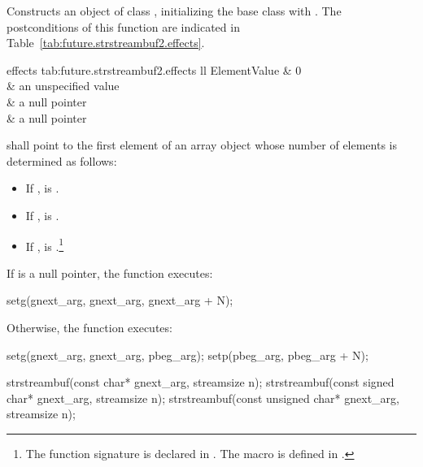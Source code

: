 \begin{itemdescr}
\pnum
\effects
Constructs an object of class
,
initializing the base class with
.
The postconditions of this function are indicated in Table~\ref{tab:future.strstreambuf2.effects}.

\begin{libtab2}{ effects}
{tab:future.strstreambuf2.effects}
{ll}
{Element}{Value}
	&	0						\\
	&	an unspecified value	\\
	&	a null pointer			\\
	&	a null pointer			\\
\end{libtab2}

\pnum
{} shall point to the first element of an array
object whose number of elements  is determined as follows:
\begin{itemize}
\item
If
,
 is .
\item
If
,
 is
.
%
\item
If
,
 is
.\footnote{The function signature
%
is declared in
%
.
The macro
is defined in
%
.}
\end{itemize}

\pnum
If  is a null pointer, the function executes:

\begin{codeblock}
setg(gnext_arg, gnext_arg, gnext_arg + N);
\end{codeblock}

\pnum
Otherwise, the function executes:

\begin{codeblock}
setg(gnext_arg, gnext_arg, pbeg_arg);
setp(pbeg_arg,  pbeg_arg + N);
\end{codeblock}
\end{itemdescr}


%
\begin{itemdecl}
strstreambuf(const char* gnext_arg, streamsize n);
strstreambuf(const signed char* gnext_arg, streamsize n);
strstreambuf(const unsigned char* gnext_arg, streamsize n);
\end{itemdecl}


